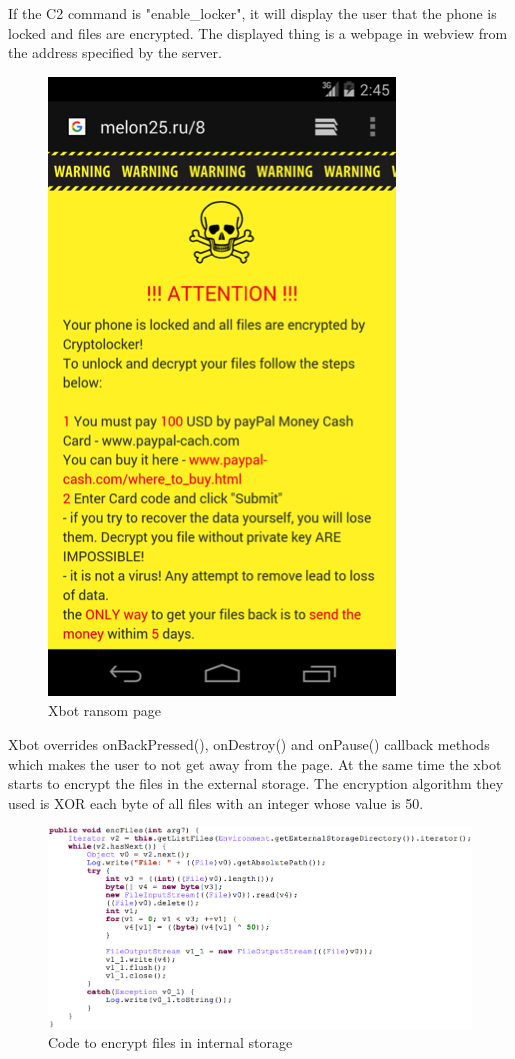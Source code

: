 If the C2 command is "enable\_locker", it will display the user that the phone is locked and files are encrypted.
The displayed thing is a webpage in webview from the address specified by the server.

\begin{figure}[H]
\centering
\includegraphics[scale=0.5]{xbot10}
\caption{Xbot ransom page}
\label{fig:ra}
\end{figure}

Xbot overrides onBackPressed(), onDestroy() and onPause() callback methods which makes the user to not get away from the page.
At the same time the xbot starts to encrypt the files in the external storage.
The encryption algorithm they used is XOR each byte of all files with an integer whose value is 50.

\begin{figure}[H]
\centering
\includegraphics[scale=0.8]{xbot11}
\caption{Code to encrypt files in internal storage}
\label{fig:ra}
\end{figure}




